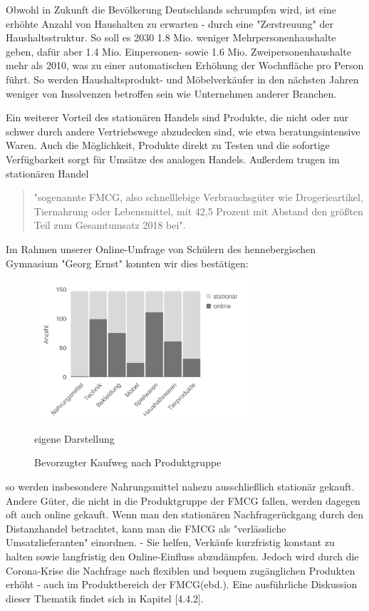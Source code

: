 \begin{folding}
Obwohl in Zukunft die Bevölkerung Deutschlands schrumpfen wird, ist eine erhöhte Anzahl von Haushalten zu erwarten - durch eine "Zerstreuung" der Haushaltsstruktur. So soll es 2030 1.8 Mio. weniger Mehrpersonenhaushalte geben, dafür aber 1.4 Mio. Einpersonen- sowie 1.6 Mio. Zweipersonenhaushalte mehr als 2010\cite[S. 35]{Nitt}, was zu einer automatischen Erhöhung der Wochnfläche pro Person führt. So werden Haushaltsprodukt- und Möbelverkäufer in den nächsten Jahren weniger von Insolvenzen betroffen sein wie Unternehmen anderer Branchen.

Ein weiterer Vorteil des stationären Handels sind Produkte, die nicht oder nur schwer durch andere Vertriebswege abzudecken sind, wie etwa beratungsintensive Waren. Auch die Möglichkeit, Produkte direkt zu Testen und die sofortige Verfügbarkeit sorgt für Umsätze des analogen Handels\cite[S. 2]{Maier}. Außerdem trugen im stationären Handel
\begin{quote}
 "sogenannte \ac{FMCG}, also schnelllebige Verbrauchsgüter wie   Drogerieartikel,   Tiernahrung   oder   Lebensmittel,   mit 42,5 Prozent mit Abstand den größten Teil zum Gesamtumsatz 2018 bei"\cite{corona-schub}.
\end{quote}

\noindent Im Rahmen unserer Online-Umfrage von Schülern des hennebergischen Gymnasium "Georg Ernst" konnten wir dies  bestätigen:  
 \begin{figure}[h]
    \begin{center}
        \includegraphics[width=8cm]{media/schuelerumfrage/1.png}
        \caption{Bevorzugter Kaufweg nach Produktgruppe}
        \label{Kaufwege}
        \bildquelle  eigene Darstellung
    \end{center}
\end{figure}
so werden insbesondere Nahrungsmittel nahezu ausschließlich stationär gekauft. Andere Güter, die nicht in die Produktgruppe der \ac{FMCG} fallen, werden dagegen oft auch online gekauft. Wenn man den stationären Nachfragerückgang durch den Distanzhandel betrachtet, kann man die \ac{FMCG} als "verlässliche Umsatzlieferanten" einordnen. - Sie helfen, Verkäufe kurzfristig konstant zu halten sowie langfristig den Online-Einfluss abzudämpfen. Jedoch wird durch die Corona-Krise die Nachfrage nach flexiblen und bequem zugänglichen Produkten erhöht - auch im Produktbereich der \ac{FMCG}(ebd.). Eine ausführliche Diskussion dieser Thematik findet sich in Kapitel [4.4.2].


\end{folding}
